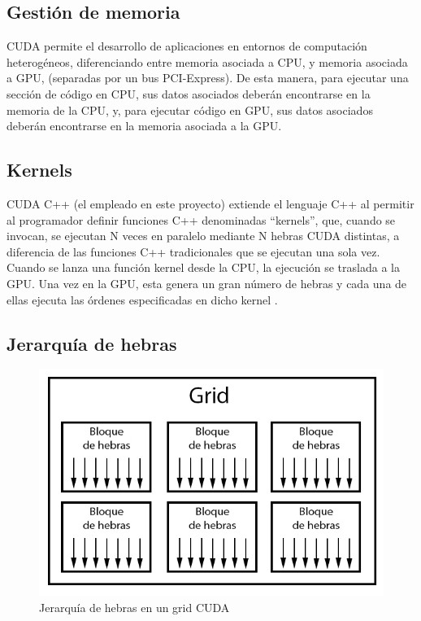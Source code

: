 \subsection{Gestión de memoria}

CUDA permite el desarrollo de aplicaciones en entornos de computación heterogéneos, diferenciando entre memoria asociada a CPU, y memoria asociada a GPU, (separadas por un bus PCI-Express). De esta manera, para ejecutar una sección de código en CPU, sus datos asociados deberán encontrarse en la memoria de la CPU, y, para ejecutar código en GPU, sus datos asociados deberán encontrarse en la memoria asociada a la GPU. 

\subsection{Kernels}

CUDA C++ (el empleado en este proyecto) extiende el lenguaje C++ al permitir al programador definir funciones C++ denominadas ``kernels'', que, cuando se invocan, se ejecutan N veces en paralelo mediante N hebras CUDA distintas, a diferencia de las funciones C++ tradicionales que se ejecutan  una sola vez. Cuando se lanza una función kernel desde la CPU, la ejecución se traslada a la GPU. Una vez en la GPU, esta genera un gran número de hebras y cada una de ellas ejecuta las órdenes especificadas en dicho kernel \cite{cuda_kernels}. \\

\subsection{Jerarquía de hebras}

\begin{figure}[H]
	\centering
	\includegraphics[scale=0.5]{imagenes/cuda_grid.jpg}  
	\caption{Jerarquía de hebras en un grid CUDA}
	\label{fig:cuda_grid}
\end{figure}

